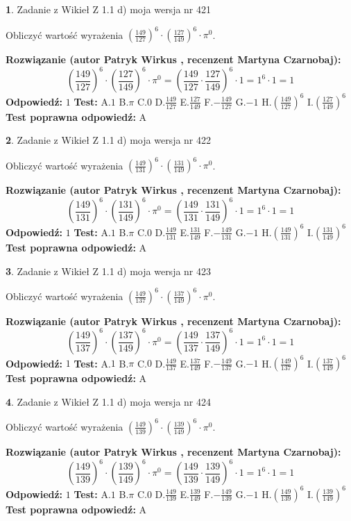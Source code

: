 \documentclass[12pt, a4paper]{article}
\theoremstyle{definition} %
\newtheorem{zad}{}
\newcommand{\zadStart}[1]{\begin{zad}#1\newline}
\newcommand{\zadStop}{\end{zad}}
\newcommand{\rozwStart}[2]{\noindent \textbf{Rozwiązanie (autor #1 , recenzent #2): }\newline}
\newcommand{\rozwStop}{\newline}
\newcommand{\odpStart}{\noindent \textbf{Odpowiedź:}\newline}
\newcommand{\odpStop}{\newline}
\newcommand{\testStart}{\noindent \textbf{Test:}\newline}
\newcommand{\testStop}{\newline}
\newcommand{\kluczStart}{\noindent \textbf{Test poprawna odpowiedź:}\newline}
\newcommand{\kluczStop}{\newline}
\begin{document}
\zadStart{Zadanie z Wikieł Z 1.1 d) moja wersja nr 421}

Obliczyć wartość wyrażenia $(\frac{149}{127})^{6} \cdot (\frac{127}{149})^{6} \cdot \pi^{0}$.
\zadStop
\rozwStart{Patryk Wirkus}{Martyna Czarnobaj}
$$(\frac{149}{127})^{6} \cdot (\frac{127}{149})^{6} \cdot \pi^{0} = (\frac{149}{127} \cdot \frac{127}{149})^{6} \cdot 1 = 1^{6} \cdot 1 = 1$$
\rozwStop
\odpStart
$1$
\odpStop
\testStart
A.$1$ B.$\pi$ C.$0$ D.$\frac{149}{127}$ E.$\frac{127}{149}$
F.$-\frac{149}{127}$ G.$-1$
H.$(\frac{149}{127})^{6}$
I.$(\frac{127}{149})^{6}$
\testStop
\kluczStart
A
\kluczStop



\zadStart{Zadanie z Wikieł Z 1.1 d) moja wersja nr 422}

Obliczyć wartość wyrażenia $(\frac{149}{131})^{6} \cdot (\frac{131}{149})^{6} \cdot \pi^{0}$.
\zadStop
\rozwStart{Patryk Wirkus}{Martyna Czarnobaj}
$$(\frac{149}{131})^{6} \cdot (\frac{131}{149})^{6} \cdot \pi^{0} = (\frac{149}{131} \cdot \frac{131}{149})^{6} \cdot 1 = 1^{6} \cdot 1 = 1$$
\rozwStop
\odpStart
$1$
\odpStop
\testStart
A.$1$ B.$\pi$ C.$0$ D.$\frac{149}{131}$ E.$\frac{131}{149}$
F.$-\frac{149}{131}$ G.$-1$
H.$(\frac{149}{131})^{6}$
I.$(\frac{131}{149})^{6}$
\testStop
\kluczStart
A
\kluczStop



\zadStart{Zadanie z Wikieł Z 1.1 d) moja wersja nr 423}

Obliczyć wartość wyrażenia $(\frac{149}{137})^{6} \cdot (\frac{137}{149})^{6} \cdot \pi^{0}$.
\zadStop
\rozwStart{Patryk Wirkus}{Martyna Czarnobaj}
$$(\frac{149}{137})^{6} \cdot (\frac{137}{149})^{6} \cdot \pi^{0} = (\frac{149}{137} \cdot \frac{137}{149})^{6} \cdot 1 = 1^{6} \cdot 1 = 1$$
\rozwStop
\odpStart
$1$
\odpStop
\testStart
A.$1$ B.$\pi$ C.$0$ D.$\frac{149}{137}$ E.$\frac{137}{149}$
F.$-\frac{149}{137}$ G.$-1$
H.$(\frac{149}{137})^{6}$
I.$(\frac{137}{149})^{6}$
\testStop
\kluczStart
A
\kluczStop



\zadStart{Zadanie z Wikieł Z 1.1 d) moja wersja nr 424}

Obliczyć wartość wyrażenia $(\frac{149}{139})^{6} \cdot (\frac{139}{149})^{6} \cdot \pi^{0}$.
\zadStop
\rozwStart{Patryk Wirkus}{Martyna Czarnobaj}
$$(\frac{149}{139})^{6} \cdot (\frac{139}{149})^{6} \cdot \pi^{0} = (\frac{149}{139} \cdot \frac{139}{149})^{6} \cdot 1 = 1^{6} \cdot 1 = 1$$
\rozwStop
\odpStart
$1$
\odpStop
\testStart
A.$1$ B.$\pi$ C.$0$ D.$\frac{149}{139}$ E.$\frac{139}{149}$
F.$-\frac{149}{139}$ G.$-1$
H.$(\frac{149}{139})^{6}$
I.$(\frac{139}{149})^{6}$
\testStop
\kluczStart
A
\kluczStop
\end{document}
